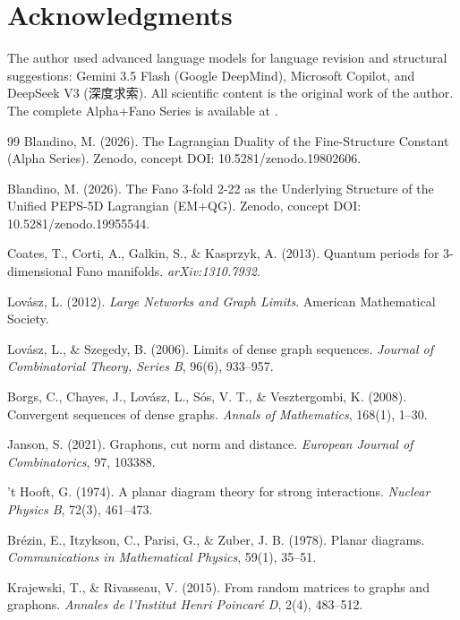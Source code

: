 \documentclass[12pt]{article}
\numberwithin{equation}{section}
\begin{document}
\section*{Acknowledgments}

The author used advanced language models for language revision and structural suggestions: Gemini 3.5 Flash (Google DeepMind), Microsoft Copilot, and DeepSeek V3 (深度求索). All scientific content is the original work of the author. The complete Alpha+Fano Series is available at \cite{blandino2026alpha}.


\begin{thebibliography}{99}
Blandino, M. (2026). The Lagrangian Duality of the Fine-Structure Constant (Alpha Series). Zenodo, concept DOI: 10.5281/zenodo.19802606.

Blandino, M. (2026). The Fano 3-fold 2-22 as the Underlying Structure of the Unified PEPS-5D Lagrangian (EM+QG). Zenodo, concept DOI: 10.5281/zenodo.19955544.

Coates, T., Corti, A., Galkin, S., \& Kasprzyk, A. (2013). Quantum periods for 3-dimensional Fano manifolds. \textit{arXiv:1310.7932}.

Lov{\'a}sz, L. (2012). \textit{Large Networks and Graph Limits}. American Mathematical Society.

Lov{\'a}sz, L., \& Szegedy, B. (2006). Limits of dense graph sequences. \textit{Journal of Combinatorial Theory, Series B}, 96(6), 933–957.

Borgs, C., Chayes, J., Lov{\'a}sz, L., S{\'o}s, V. T., \& Vesztergombi, K. (2008). Convergent sequences of dense graphs. \textit{Annals of Mathematics}, 168(1), 1–30.

Janson, S. (2021). Graphons, cut norm and distance. \textit{European Journal of Combinatorics}, 97, 103388.

't Hooft, G. (1974). A planar diagram theory for strong interactions. \textit{Nuclear Physics B}, 72(3), 461–473.

Br{\'e}zin, E., Itzykson, C., Parisi, G., \& Zuber, J. B. (1978). Planar diagrams. \textit{Communications in Mathematical Physics}, 59(1), 35–51.

Krajewski, T., \& Rivasseau, V. (2015). From random matrices to graphs and graphons. \textit{Annales de l'Institut Henri Poincar{\'e} D}, 2(4), 483–512.


\end{thebibliography}
\end{document}
